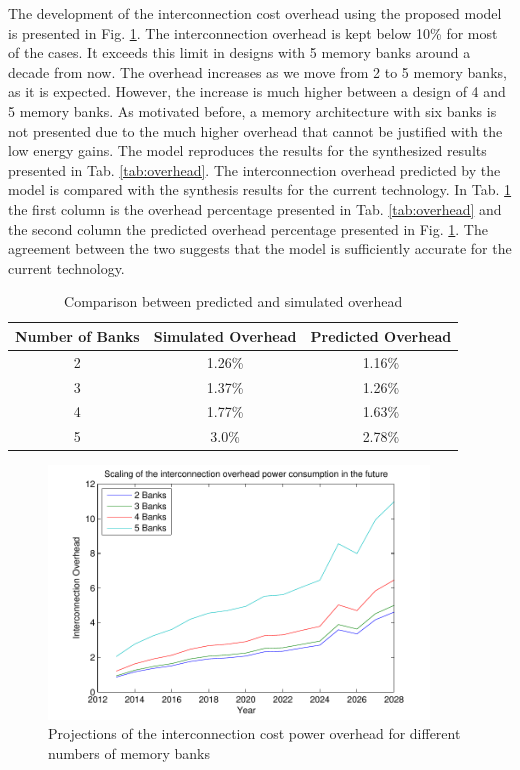  The development of the interconnection cost overhead using the proposed model is presented in Fig. \ref{fig:overheadE}.
 The interconnection overhead is kept below 10\% for most of the cases.
 It exceeds this limit in designs with 5 memory banks around a decade from now.
 The overhead increases as we move from 2 to 5 memory banks, as it is expected.
 However, the increase is much higher between a design of 4 and 5 memory banks.
 As motivated before, a memory architecture with six banks is not presented due to the much higher overhead that cannot be justified with the low energy gains.
 The model reproduces the results for the synthesized results presented in Tab. \ref{tab:overhead}.
 The interconnection overhead predicted by the model is compared with the synthesis results for the current technology.
 In Tab. \ref{tab:verification} the first column is the overhead percentage presented in Tab. \ref{tab:overhead} and the second column the predicted overhead percentage presented in Fig. \ref{fig:overheadE}.
 The agreement between the two suggests that the model is sufficiently accurate for the current technology.
 
 \begin{center}
	\begin{table}
	\caption{Comparison between predicted and simulated overhead}
	\label{tab:verification}
	\centering
	{
	\begin{tabular}{|c|c|c|}
	\hline
	Number of Banks &	Simulated Overhead & Predicted Overhead \\
	\hline
	2 & 1.26\%  & 1.16\% \\
	\hline 
	3 & 1.37\%  & 1.26\% \\
	\hline 
	4 & 1.77\% & 1.63\% \\
	\hline
	5 & 3.0\% & 2.78\% \\
	\hline	
	\end{tabular}}
	\end{table}
\end{center}

 \begin{figure}
 \centering
 \includegraphics[width = 0.9\textwidth]{E/overhead.pdf}
  \caption{Projections of the interconnection cost power overhead for different numbers of memory banks}
 \label{fig:overheadE}
 \end{figure} 
 
